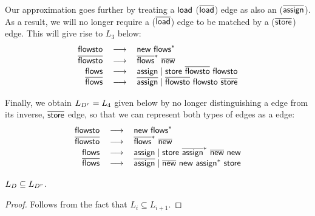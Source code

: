 Our approximation goes further by treating a $\textsf{load}$ ($\overline{\textsf{load}}$) edge as also an \assign ($\overline{\textsf{assign}}$). As a result, we will no longer require a \store ($\overline{\textsf{load}}$) edge
to be matched by
a \load ($\overline{\textsf{store}}$) edge. This will give rise to $L_3$ below:
\begin{equation}
\label{eqn:newL3}
\begin{tabular}{rcl} 
$\flowsto$ & $\longrightarrow$ &  $\new ~ \flows^*$ \\
$\iflowsto$ &  $\longrightarrow$ & $\iflows^* ~ \inew$ \\
$\flows$ &  $\longrightarrow$ & $\assign \mid  \store \ \iflowsto\ \flowsto$\\
$\iflows$ &  $\longrightarrow$ & $\iassign \mid \iflowsto\ \flowsto \ \istore$
\end{tabular}
\end{equation}

Finally, we obtain $\mbox{${L}_{D^r}$}=L_4$ given below by
no longer distinguishing a \store edge from its inverse, $\overline{\textsf{store}}$ edge, so that we can
represent both types of edges as a \store edge:\\
\begin{equation}
\label{eqn:newLR}
\begin{tabular}{rcl} 
$\flowsto$ &  $\longrightarrow$ & $\new ~ \flows^*$ \\
$\iflowsto$ & $\longrightarrow$ & $\iflows^* ~ \inew$ \\
$\flows$ & $\longrightarrow$ & $\assign \mid  \store \ \iassign^* ~ \inew\ \new$ \\
$\iflows$ & $\longrightarrow$ & $\iassign \mid \inew \ \new ~ \assign^* \ \store$ 
\end{tabular}
\end{equation}

\begin{lem}
    \label{thm:LRsubsumeLF}
    $\mbox{${L}_D$} \subseteq \mbox{${L}_{D^r}$}$.
\end{lem}
\begin{proof}
    Follows  from the fact that $L_i \subseteq L_{i+1}$. 
\end{proof}

 

